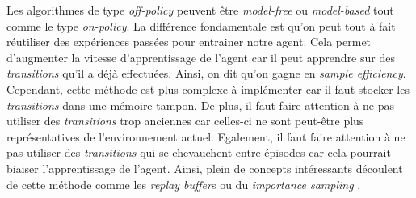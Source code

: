 Les algorithmes de type \textit{off-policy} peuvent être \textit{model-free} ou \textit{model-based} tout comme le type \textit{on-policy}. La différence fondamentale est qu'on peut tout à fait réutiliser des expériences passées pour entrainer notre agent. Cela permet d'augmenter la vitesse d'apprentissage de l'agent car il peut apprendre sur des \textit{transitions} qu'il a déjà effectuées. Ainsi, on dit qu'on gagne en \textit{sample efficiency}. Cependant, cette méthode est plus complexe à implémenter car il faut stocker les \textit{transitions} dans une mémoire tampon. De plus, il faut faire attention à ne pas utiliser des \textit{transitions} trop anciennes car celles-ci ne sont peut-être plus représentatives de l'environnement actuel. Egalement, il faut faire attention à ne pas utiliser des \textit{transitions} qui se chevauchent entre épisodes car cela pourrait biaiser l'apprentissage de l'agent. Ainsi, plein de concepts intéressants découlent de cette méthode comme les \textit{replay buffer}s ou du \textit{importance sampling} \cite{PER}.